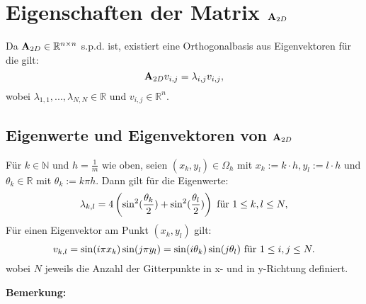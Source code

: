

\section{Eigenschaften der Matrix ${\textbf{A}}_{2D}$}\label{s.Eigenwerte und Eigenvektoren}

Da ${\textbf{A}}_{2D} \in \mathbb{R}^{n \times n}$ s.p.d. ist, existiert eine Orthogonalbasis aus Eigenvektoren für die gilt:
\begin{equation}
{\textbf{A}}_{2D}v_{i,j} = \lambda_{i,j} v_{i,j},
\end{equation}
wobei $\lambda_{1,1},...,\lambda_{N,N} \in \mathbb{R}$ und $v_{i,j} \in \mathbb{R}^{n}$.

\subsection{Eigenwerte und Eigenvektoren von ${\textbf{A}}_{2D}$}\label{ss.Eigenwerte und Eigenvektoren}

Für $k \in \mathbb{N}$ und $h = \frac {1} {m}$ wie oben, seien $(x_{k},y_{l}) \in \Omega_{h}$ mit $x_{k} := k \cdot h, y_{l} := l \cdot h$ und $\theta_{k} \in \mathbb{R}$ mit $\theta_{k} := k \pi h$. Dann gilt für die Eigenwerte:
\begin{equation}
\lambda_{k,l} = 4 \left(\sin^{2}(\frac {\theta_{k}} {2}) + \sin^{2}(\frac {\theta_{l}} {2}) \right) \textnormal{ für } 1 \le k,l \le N,\label{eq.Eigenwerte}
\end{equation}
Für einen Eigenvektor am Punkt $(x_{k},y_{l})$ gilt:
\begin{equation}
v_{k,l} = \sin(i \pi x_{k}) \sin(j \pi y_{l}) = \sin(i\theta_{k}) \sin(j\theta_{l}) \textnormal{ für } 1 \le i,j \le N.
\end{equation}
wobei $N$ jeweils die Anzahl der Gitterpunkte in x- und in y-Richtung definiert.

\textbf{Bemerkung:}

